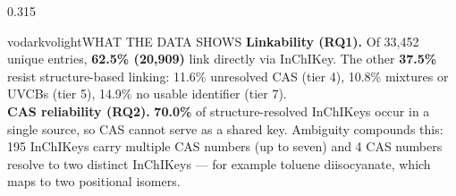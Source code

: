 \documentclass[final]{beamer}
\newlength{\colh}
\newcommand{\figcap}[1]{\vspace{2mm}{\footnotesize\itshape #1}\vspace{2mm}}
\begin{document}
\begin{frame}[t]
\begin{columns}[t,onlytextwidth]
            \begin{column}{0.315\textwidth}
                \begin{minipage}[t][\colh][s]{\linewidth}
                    \rule{0pt}{0pt}%
                    \begin{pbox}{vodark}{volight}{WHAT THE DATA SHOWS}
                        \justifying
                        \textbf{Linkability (RQ1).} Of 33,452 unique entries, \textbf{62.5\%
                        (20,909)} link directly via InChIKey. The other \textbf{37.5\%} resist
                        structure-based linking: 11.6\% unresolved CAS (tier 4), 10.8\% mixtures or
                        UVCBs (tier 5), 14.9\% no usable identifier (tier 7).\\[5mm]
                        \textbf{CAS reliability (RQ2).} \textbf{70.0\%} of structure-resolved
                        InChIKeys occur in a single source, so CAS cannot serve as a shared key.
                        Ambiguity compounds this: 195 InChIKeys carry multiple CAS numbers (up to
                        seven) and 4 CAS numbers resolve to two distinct InChIKeys --- for example
                        toluene diisocyanate, which maps to two positional isomers.
                    \end{pbox}
                    \vfill

                {\centering\par}   

                    \vfill


\end{minipage}
\end{column}
\end{columns}
\end{frame}
\end{document}
